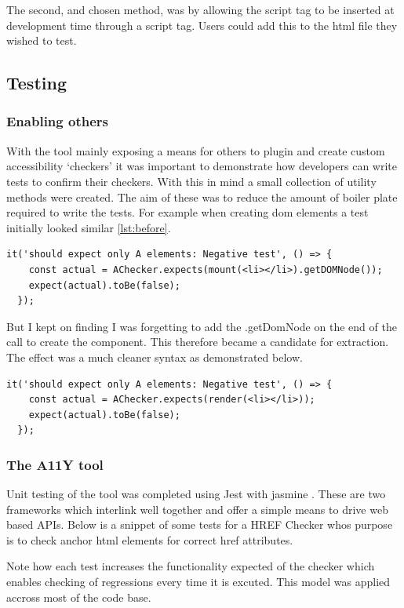 The second, and chosen method, was by allowing the script tag to be inserted
at development time through a script tag. Users could add this to the html
file they wished to test.

\subsection{Testing}
\subsubsection{Enabling others}
With the tool mainly exposing a means for others to plugin and create custom
accessibility `checkers' it was important to demonstrate how developers can
write tests to confirm their checkers. With this in mind a small collection
of utility methods were created. The aim of these was to reduce the amount of
boiler plate required to write the tests. For example when creating dom
elements a test initially looked similar \ref{lst:before}.
\begin{lstlisting}[label={lst:before}]
  it('should expect only A elements: Negative test', () => {
    const actual = AChecker.expects(mount(<li></li>).getDOMNode());
    expect(actual).toBe(false);
  });
\end{lstlisting}

But I kept on finding I was forgetting to add the .getDomNode on the end of
the call to create the component. This therefore became a candidate for
extraction. The effect was a much cleaner syntax as demonstrated below.

\begin{lstlisting}[label={lst:before}]
  it('should expect only A elements: Negative test', () => {
    const actual = AChecker.expects(render(<li></li>));
    expect(actual).toBe(false);
  });
\end{lstlisting}


\subsubsection{The A11Y tool}
Unit testing of the tool was completed using Jest \citep{jest} with jasmine
\citep{jasmine}. These are two frameworks which interlink well
together and offer a simple means to drive web based APIs. Below is a snippet
of some tests for a HREF Checker whos purpose is to check anchor html elements
for correct href attributes.

Note how each test increases the functionality expected of the checker which
enables checking of regressions every time it is excuted. This model was
applied accross most of the code base.

